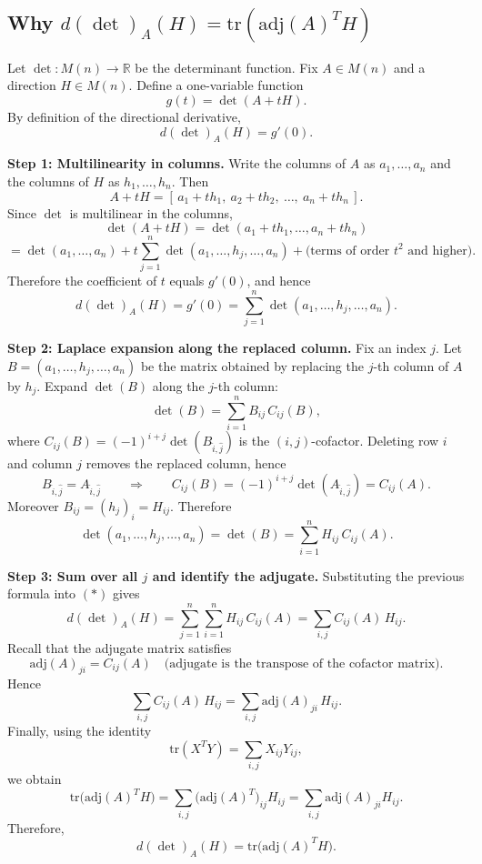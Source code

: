 \documentclass[12pt,a4paper]{article}
\theoremstyle{plain}
\theoremstyle{definition}      %
\begin{document}
	\subsection*{Why $d(\det)_A(H)=\mathrm{tr}(\mathrm{adj}(A)^T H)$}
	
	\noindent
	Let $\det:M(n)\to\mathbb{R}$ be the determinant function. Fix $A\in M(n)$ and a direction $H\in M(n)$.
	Define a one-variable function
	\[
	g(t)=\det(A+tH).
	\]
	By definition of the directional derivative,
	\[
	d(\det)_A(H)=g'(0).
	\]
	
	\medskip
	\noindent\textbf{Step 1: Multilinearity in columns.}
	Write the columns of $A$ as $a_1,\dots,a_n$ and the columns of $H$ as $h_1,\dots,h_n$.
	Then
	\[
	A+tH=[\,a_1+th_1,\ a_2+th_2,\ \dots,\ a_n+th_n\,].
	\]
	Since $\det$ is multilinear in the columns,
	\[
	\det(A+tH)=\det(a_1+th_1,\dots,a_n+th_n)
	\]
	\[
	=\det(a_1,\dots,a_n)
	+t\sum_{j=1}^n \det(a_1,\dots,h_j,\dots,a_n)
	+\text{(terms of order }t^2\text{ and higher)}.
	\]
	Therefore the coefficient of $t$ equals $g'(0)$, and hence
	\[
	d(\det)_A(H)=g'(0)=\sum_{j=1}^n \det(a_1,\dots,h_j,\dots,a_n).
	\tag{$\ast$}
	\]
	
	\medskip
	\noindent\textbf{Step 2: Laplace expansion along the replaced column.}
	Fix an index $j$. Let $B=(a_1,\dots,h_j,\dots,a_n)$ be the matrix obtained by replacing the $j$-th column of $A$ by $h_j$.
	Expand $\det(B)$ along the $j$-th column:
	\[
	\det(B)=\sum_{i=1}^n B_{ij}\,C_{ij}(B),
	\]
	where $C_{ij}(B)=(-1)^{i+j}\det(B_{\widehat{i},\widehat{j}})$ is the $(i,j)$-cofactor.
	Deleting row $i$ and column $j$ removes the replaced column, hence
	\[
	B_{\widehat{i},\widehat{j}}=A_{\widehat{i},\widehat{j}}
	\qquad\Longrightarrow\qquad
	C_{ij}(B)=(-1)^{i+j}\det(A_{\widehat{i},\widehat{j}})=C_{ij}(A).
	\]
	Moreover $B_{ij}=(h_j)_i=H_{ij}$. Therefore
	\[
	\det(a_1,\dots,h_j,\dots,a_n)=\det(B)=\sum_{i=1}^n H_{ij}\,C_{ij}(A).
	\]
	
	\medskip
	\noindent\textbf{Step 3: Sum over all $j$ and identify the adjugate.}
	Substituting the previous formula into $(\ast)$ gives
	\[
	d(\det)_A(H)=\sum_{j=1}^n\sum_{i=1}^n H_{ij}\,C_{ij}(A)
	=\sum_{i,j} C_{ij}(A)\,H_{ij}.
	\]
	Recall that the adjugate matrix satisfies
	\[
	\mathrm{adj}(A)_{ji}=C_{ij}(A)
	\quad\text{(adjugate is the transpose of the cofactor matrix).}
	\]
	Hence
	\[
	\sum_{i,j} C_{ij}(A)\,H_{ij}
	=\sum_{i,j} \mathrm{adj}(A)_{ji}\,H_{ij}.
	\]
	Finally, using the identity
	\[
	\mathrm{tr}(X^T Y)=\sum_{i,j} X_{ij}Y_{ij},
	\]
	we obtain
	\[
	\mathrm{tr}\big(\mathrm{adj}(A)^T H\big)
	=\sum_{i,j} \big(\mathrm{adj}(A)^T\big)_{ij}H_{ij}
	=\sum_{i,j} \mathrm{adj}(A)_{ji}H_{ij}.
	\]
	Therefore,
	\[
	d(\det)_A(H)=\mathrm{tr}\big(\mathrm{adj}(A)^T H\big).
	\]
	
\end{document}
